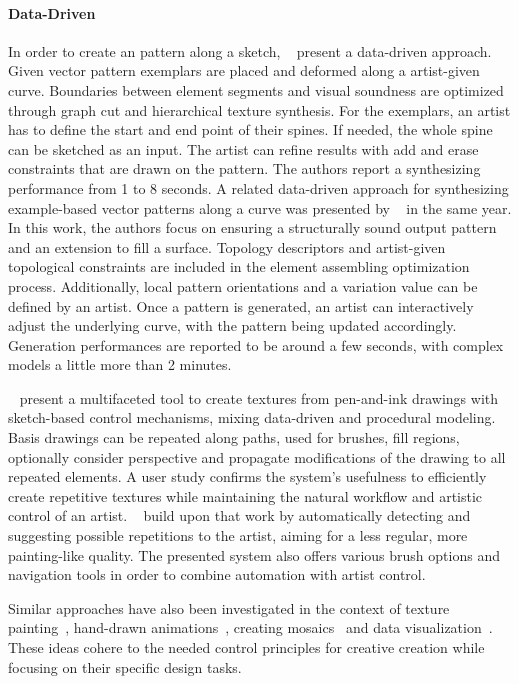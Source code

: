 \paragraph*{Data-Driven}
\label{para:analysis_rulebased_sketchbased_datadriven}
In order to create an pattern along a sketch, \citeauthor*{lu_2014_dds}~\cite{lu_2014_dds} present a data-driven approach. Given vector pattern exemplars are placed and deformed along a artist-given curve. Boundaries between element segments and visual soundness are optimized through graph cut and hierarchical texture synthesis. For the exemplars, an artist has to define the start and end point of their spines. If needed, the whole spine can be sketched as an input. The artist can refine results with add and erase constraints that are drawn on the pattern. The authors report a synthesizing performance from 1 to 8 seconds. A related data-driven approach for synthesizing example-based vector patterns along a curve was presented by \citeauthor*{zhou_2014_tsv}~\cite{zhou_2014_tsv} in the same year. In this work, the authors focus on ensuring a structurally sound output pattern and an extension to fill a surface. Topology descriptors and artist-given topological constraints are included in the element assembling optimization process. Additionally, local pattern orientations and a variation value can be defined by an artist. Once a pattern is generated, an artist can interactively adjust the underlying curve, with the pattern being updated accordingly. Generation performances are reported to be around a few seconds, with complex models a little more than 2 minutes.

\citeauthor*{kazi_2012_vit}~\cite{kazi_2012_vit} present a multifaceted tool to create textures from pen-and-ink drawings with sketch-based control mechanisms, mixing data-driven and procedural modeling. Basis drawings can be repeated along paths, used for brushes, fill regions, optionally consider perspective and propagate modifications of the drawing to all repeated elements. A user study confirms the system's usefulness to efficiently create repetitive textures while maintaining the natural workflow and artistic control of an artist. \citeauthor*{xing_2014_apr}~\cite{xing_2014_apr} build upon that work by automatically detecting and suggesting possible repetitions to the artist, aiming for a less regular, more painting-like quality. The presented system also offers various brush options and navigation tools in order to combine automation with artist control.

Similar approaches have also been investigated in the context of texture painting~\cite{lukac_2013_pft}, hand-drawn animations~\cite{xing_2015_aha}, creating mosaics~\cite{igarashi_2010_dde,abdrashitov_2014_msi} and data visualization~\cite{xia_2018_ddc}. These ideas cohere to the needed control principles for creative creation while focusing on their specific design tasks. 


